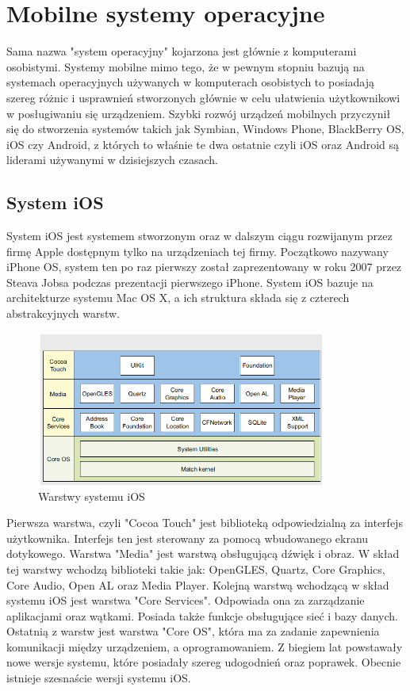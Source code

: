 \documentclass[a4paper,12pt,oneside]{book}
\begin{document}
	\section{Mobilne systemy operacyjne}
	Sama nazwa "system operacyjny" kojarzona jest głównie z komputerami osobistymi. Systemy mobilne mimo tego, że w pewnym stopniu bazują na systemach operacyjnych używanych w komputerach osobistych to posiadają szereg różnic i usprawnień stworzonych głównie w celu ułatwienia użytkownikowi w posługiwaniu się urządzeniem. Szybki rozwój urządzeń mobilnych przyczynił się do stworzenia systemów takich jak Symbian, Windows Phone, BlackBerry OS, iOS czy Android, z których to właśnie te dwa ostatnie czyli iOS oraz Android są liderami używanymi w dzisiejszych czasach.
	
	\subsection{System iOS}
	System iOS jest systemem stworzonym oraz w dalszym ciągu rozwijanym przez firmę Apple dostępnym tylko na urządzeniach tej firmy. Początkowo nazywany iPhone OS, system ten po raz pierwszy został zaprezentowany w roku 2007 przez Steava Jobsa podczas prezentacji pierwszego iPhone. System iOS bazuje na architekturze systemu Mac OS X, a ich struktura składa się z czterech abstrakcyjnych warstw.
	
	\newpage
	
	\begin{figure}[h]
		\centering
		\includegraphics[width=0.85\textwidth]{grafika/warstwy_ios.png}
		\caption{Warstwy systemu iOS}
	\end{figure}

	Pierwsza warstwa, czyli "Cocoa Touch" jest biblioteką odpowiedzialną za interfejs użytkownika. Interfejs ten jest sterowany za pomocą wbudowanego ekranu dotykowego. Warstwa "Media" jest warstwą obsługującą dźwięk i obraz. W skład tej warstwy wchodzą biblioteki takie jak: OpenGLES, Quartz, Core Graphics, Core Audio, Open AL oraz Media Player. Kolejną warstwą wchodzącą w skład systemu iOS jest warstwa "Core Services". Odpowiada ona za zarządzanie aplikacjami oraz wątkami. Posiada także funkcje obsługujące sieć i bazy danych. Ostatnią z warstw jest warstwa "Core OS", która ma za zadanie zapewnienia komunikacji między urządzeniem, a oprogramowaniem. Z biegiem lat powstawały nowe wersje systemu, które posiadały szereg udogodnień oraz poprawek. Obecnie istnieje szesnaście wersji systemu iOS. 
	
\end{document}

